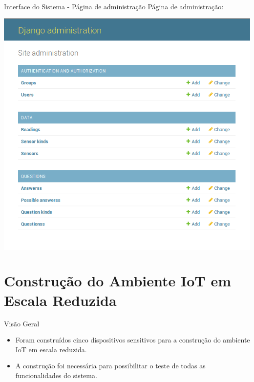 \documentclass{beamer}
\begin{document}
  \begin{frame}{Interface do Sistema - Página de administração}
    \quad Página de administração:
    \begin{center}
    \includegraphics[scale=0.3]{admin}
    \end{center}
  \end{frame}

  \section{Construção do Ambiente IoT em Escala Reduzida}
    \begin{frame}{Visão Geral}
      \begin{itemize}
          \item Foram construídos cinco dispositivos sensitivos para a construção do ambiente IoT em escala reduzida.
          \item A construção foi necessária para possibilitar o teste de todas as funcionalidades do sistema.
      \end{itemize}
    \end{frame}
\end{document}
